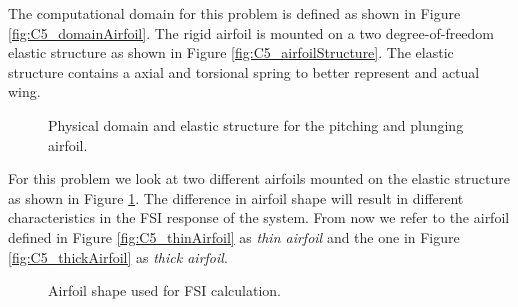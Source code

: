 The computational domain for this problem is defined as shown in Figure \ref{fig:C5_domainAirfoil}. The rigid airfoil is mounted on a two degree-of-freedom elastic structure as shown in Figure \ref{fig:C5_airfoilStructure}. The elastic structure contains a axial and torsional spring to better represent and actual wing.
%
\begin{figure}[H]
    \centering
    \quad
    \caption{Physical domain and elastic structure for the pitching and plunging airfoil.}
\end{figure}
%
For this problem we look at two different airfoils mounted on the elastic structure as shown in Figure \ref{fig:C5_airfoilShape}. The difference in airfoil shape will result in different characteristics in the FSI response of the system. From now we refer to the airfoil defined in Figure \ref{fig:C5_thinAirfoil} as \emph{thin airfoil} and the one in Figure \ref{fig:C5_thickAirfoil} as \emph{thick airfoil}.
%
\begin{figure}[H]
    \centering
    \quad
    \caption{Airfoil shape used for FSI calculation.}
    \label{fig:C5_airfoilShape}
\end{figure}

